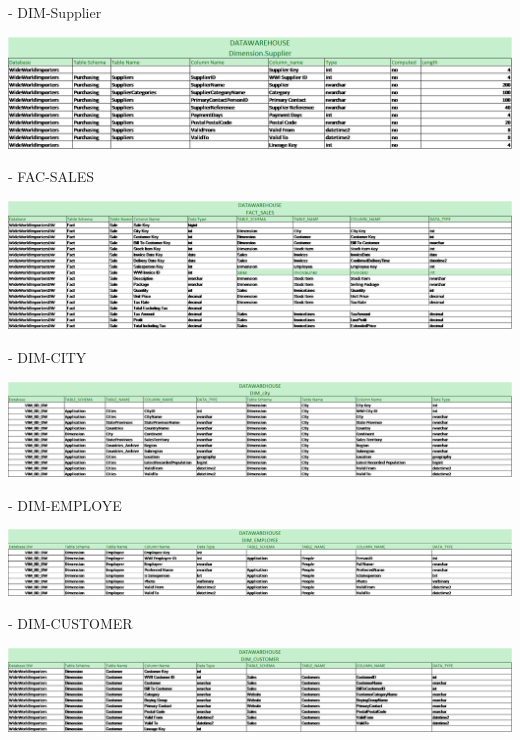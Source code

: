 \documentclass[12pt,letterpaper]{article}
\begin{document}
- DIM-Supplier\\

\begin{center}
\includegraphics[width=17cm]{IMG/22.png} 
\end{center}

- FAC-SALES\\

\begin{center}
\includegraphics[width=17cm]{IMG/23.png} 
\end{center}
- DIM-CITY\\

\begin{center}
\includegraphics[width=17cm]{IMG/24.png} 
\end{center}

- DIM-EMPLOYE\\

\begin{center}
\includegraphics[width=17cm]{IMG/25.png} 
\end{center}

- DIM-CUSTOMER\\
\begin{center}
\includegraphics[width=17cm]{IMG/26.png} 
\end{center}
\end{document}
